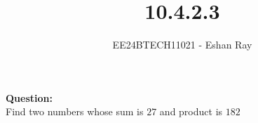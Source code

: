 \documentclass[journal]{IEEEtran}
\begin{document}

\vspace{3cm}

\title{10.4.2.3}
\author{EE24BTECH11021 - Eshan Ray}

{\let\newpage\relax\maketitle}

\renewcommand{\thefigure}{\theenumi}
\renewcommand{\thetable}{\theenumi}
\setlength{\intextsep}{10pt} %

\textbf{Question:}\\
Find two numbers whose sum is $27$ and product is $182$\\
\end{document}

